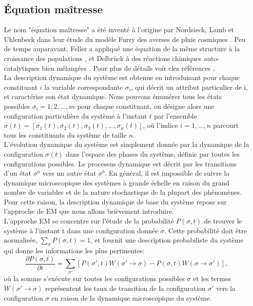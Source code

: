 \subsection{Équation maîtresse}
Le nom "équation maîtresse" a été inventé à l'origine par Nordsieck, Lamb et Uhlenbeck \cite{Nordsieck-al1940} dans leur étude du modèle Furry des averses de pluie cosmiques \cite{Furry1937}. Peu de temps auparavant, Feller a appliqué une équation de la même structure à la croissance des populations \cite{Feller1939}, et Delbrück à des réactions chimiques auto-catalytiques bien mélangées \cite{Delbruck1940}. Pour plus de détails voir cles références \cite{Kampen2007,Gardiner2009,Weber-Frey2017}.\\
La description dynamique du système est obtenue en introduisant pour chaque constituant $i$ la variable correspondante $\sigma_i$, qui décrit un attribut particulier de i, et caractérise son état dynamique. Nous pouvons énumérer tous les états possibles $\sigma_i=1, 2,. . ., m$ pour chaque constituant, on désigne alors une configuration particulière du système à l'instant $t$ par l'ensemble $\sigma(t)=[\sigma_1(t),\sigma_2(t),\sigma_3(t), ...,\sigma_n(t)]$, où l'indice $i = 1,. . ., n$ parcourt tous les constituants du système de taille $n$.\\
L'évolution dynamique du système est simplement donnée par la dynamique de la configuration $\sigma(t)$ dans l'espace des phases du système, définie par toutes les configurations possibles. Le processus dynamique est décrit par les transitions d'un état $\sigma^a$ vers un autre état $\sigma^b$. En général, il est impossible de suivre la dynamique microscopique des systèmes à grande échelle en raison du grand nombre de variables et de la nature stochastique de la plupart des phénomènes. Pour cette raison, la description dynamique de base du système repose sur l'approche de EM que nous allons brièvement introduire.\\
L'approche EM se concentre sur l'étude de la probabilité $P(\sigma,t)$ de trouver le système à l'instant t dans une configuration donnée $\sigma$. Cette probabilité doit être normalisée, $\sum_{\sigma}P(\sigma,t)=1$, et fournit une description probabiliste du système qui donne les informations les plus pertinentes:
\begin{equation}
\frac{\partial P(\sigma,t)}{\partial t}=\sum_{\sigma'}[P(\sigma',t)W(\sigma'\rightarrow \sigma)-P(\sigma,t)W(\sigma\rightarrow \sigma')],
\end{equation}
où la somme s'exécute sur toutes les configurations possibles $\sigma$ et les termes $W(\sigma'\rightarrow \sigma)$ représentent les taux de transition de la configuration $\sigma'$ vers la configuration $\sigma$ en raison de la dynamique microscopique du système.\\ 
